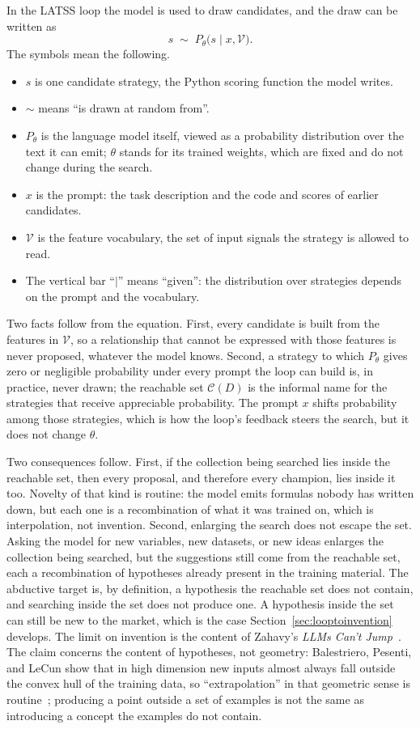 \documentclass[11pt]{article}
\begin{document}
In the LATSS loop the model is used to draw candidates, and the draw can be written as
\begin{equation}
s \;\sim\; P_{\theta}\bigl(s \mid x, \mathcal{V}\bigr).
\label{eq:proposal}
\end{equation}
The symbols mean the following.
\begin{itemize}[leftmargin=1.4em]
\item $s$ is one candidate strategy, the Python scoring function the model writes.
\item $\sim$ means ``is drawn at random from''.
\item $P_{\theta}$ is the language model itself, viewed as a probability distribution over the text it can
emit; $\theta$ stands for its trained weights, which are fixed and do not change during the search.
\item $x$ is the prompt: the task description and the code and scores of earlier candidates.
\item $\mathcal{V}$ is the feature vocabulary, the set of input signals the strategy is allowed to read.
\item The vertical bar ``$\mid$'' means ``given'': the distribution over strategies depends on the prompt
and the vocabulary.
\end{itemize}
Two facts follow from the equation. First, every candidate is built from the features in $\mathcal{V}$,
so a relationship that cannot be expressed with those features is never proposed, whatever the model
knows. Second, a strategy to which $P_{\theta}$ gives zero or negligible probability under every prompt the
loop can build is, in practice, never drawn; the reachable set $\mathcal{C}(D)$ is the informal name for
the strategies that receive appreciable probability. The prompt $x$ shifts probability among those
strategies, which is how the loop's feedback steers the search, but it does not change $\theta$.

Two consequences follow. First, if the collection being searched lies inside the reachable set, then
every proposal, and therefore every champion, lies inside it too. Novelty of that kind is routine: the
model emits formulas nobody has written down, but each one is a recombination of what it was trained
on, which is interpolation, not invention. Second, enlarging the search does not escape the set. Asking
the model for new variables, new datasets, or new ideas enlarges the collection being searched, but the
suggestions still come from the reachable set, each a recombination of hypotheses already present in
the training material. The abductive target is, by definition, a hypothesis the reachable set does not
contain, and searching inside the set does not produce one. A hypothesis inside the set can still be
new to the market, which is the case Section~\ref{sec:looptoinvention} develops. The limit on
invention is the content of Zahavy's
\emph{LLMs Can't Jump}~\cite{zahavy}. The claim concerns the content of hypotheses, not geometry:
Balestriero, Pesenti, and LeCun show that in high dimension new inputs almost always fall outside the
convex hull of the training data, so ``extrapolation'' in that geometric sense is routine~\cite{lecun};
producing a point outside a set of examples is not the same as introducing a concept the examples do
not contain.
\end{document}
